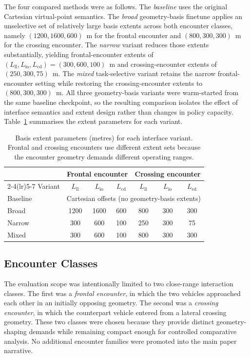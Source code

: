\documentclass[drones,article,submit,pdftex,moreauthors]{Definitions/mdpi}
\begin{document}
The four compared methods were as follows. The \emph{baseline} uses the original Cartesian virtual-point semantics. The \emph{broad} geometry-basis finetune applies an unselective set of relatively large basis extents across both encounter classes, namely $(1200,1600,600)$~m for the frontal encounter and $(800,300,300)$~m for the crossing encounter. The \emph{narrow} variant reduces those extents substantially, yielding frontal-encounter extents of $(L_{\mathrm{ll}},L_{\mathrm{io}},L_{\mathrm{cd}})=(300,600,100)$~m and crossing-encounter extents of $(250,300,75)$~m. The \emph{mixed} task-selective variant retains the narrow frontal-encounter setting while restoring the crossing-encounter extents to $(800,300,300)$~m. All three geometry-basis variants were warm-started from the same baseline checkpoint, so the resulting comparison isolates the effect of interface semantics and extent design rather than changes in policy capacity. Table~\ref{tab:extent_design} summarises the extent parameters for each variant.

\begin{table}[t]
\centering
\caption{Basis extent parameters (metres) for each interface variant. Frontal and crossing encounters use different extent sets because the encounter geometry demands different operating ranges.}
\label{tab:extent_design}
\begin{tabular}{@{}lcccccc@{}}
\toprule
& \multicolumn{3}{c}{Frontal encounter} & \multicolumn{3}{c}{Crossing encounter} \\
\cmidrule(lr){2-4}\cmidrule(lr){5-7}
Variant & $L_{\mathrm{ll}}$ & $L_{\mathrm{io}}$ & $L_{\mathrm{cd}}$ & $L_{\mathrm{ll}}$ & $L_{\mathrm{io}}$ & $L_{\mathrm{cd}}$ \\
\midrule
Baseline & \multicolumn{6}{c}{Cartesian offsets (no geometry-basis extents)} \\
Broad & 1200 & 1600 & 600 & 800 & 300 & 300 \\
Narrow & 300 & 600 & 100 & 250 & 300 & 75 \\
Mixed & 300 & 600 & 100 & 800 & 300 & 300 \\
\bottomrule
\end{tabular}
\end{table}

\subsection{Encounter Classes}

The evaluation scope was intentionally limited to two close-range interaction classes. The first was a \emph{frontal encounter}, in which the two vehicles approached each other in an initially opposing geometry. The second was a \emph{crossing encounter}, in which the counterpart vehicle entered from a lateral crossing geometry. These two classes were chosen because they provide distinct geometry-shaping demands while remaining compact enough for controlled comparative analysis. No additional encounter families were promoted into the main paper narrative.
\end{document}
